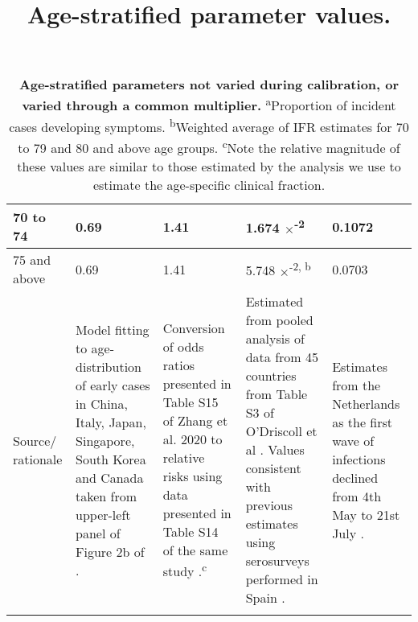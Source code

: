 \begin{table}[ht]
\begin{tabular}[ht]{| p{2cm} | p{2.5cm} | p{3cm} | p{3cm} | p{2.5cm}|}
        \hline
        70 to 74 & 0.69 & 1.41 & 1.674 $\times$\textsuperscript{-2} & 0.1072 \\
        \hline
        75 and above & 0.69 & 1.41 & 5.748 $\times$\textsuperscript{-2, b} & 0.0703 \\
        \hline
        Source/ rationale & 
        Model fitting to age-distribution of early cases in China, Italy, Japan, Singapore, South Korea and Canada taken from upper-left panel of Figure 2b of \cite{RN33}. & 
        Conversion of odds ratios presented in Table S15 of Zhang et al. 2020 to relative risks using data presented in Table S14 of the same study \cite{RN7}.\textsuperscript{c} &
        Estimated from pooled analysis of data from 45 countries from Table S3 of O'Driscoll et al \cite{RN6}. Values consistent with previous estimates using serosurveys performed in Spain \cite{RN21}. &
        Estimates from the Netherlands as the first wave of infections declined from 4th May to 21st July \cite{RN9}. \\ \hline

	\caption{\textbf{Age-stratified parameters not varied during calibration, or varied through a common multiplier.} \textsuperscript{a}Proportion of incident cases developing symptoms. \textsuperscript{b}Weighted average of IFR estimates for 70 to 79 and 80 and above age groups. \textsuperscript{c}Note the relative magnitude of these values are similar to those estimated by the analysis we use to estimate the age-specific clinical fraction.}
	\title{Age-stratified parameter values.}
	\end{tabular}
	\label{age_params}
\end{table}

\clearpage